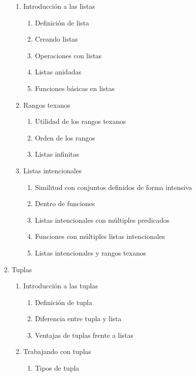 \documentclass[11pt, letter-paper]{article}
\begin{document}
\begin{enumerate}
\begin{enumerate}
        \item Introducción a las listas
        \begin{enumerate}
            \item Definición de lista
            \item Creando listas
            \item Operaciones con listas
            \item Listas anidadas
            \item Funciones básicas en listas
        \end{enumerate}
        \item Rangos texanos
        \begin{enumerate}
            \item Utilidad de los rangos texanos
            \item Orden de los rangos
            \item Listas infinitas
        \end{enumerate}
        \item Listas intencionales
        \begin{enumerate}
            \item Similitud con conjuntos definidos de forma intensiva
            \item Dentro de funciones
            \item Listas intencionales con múltiples predicados
            \item Funciones con múltiples listas intencionales
            \item Listas intencionales y rangos texanos
        \end{enumerate}
    \end{enumerate}
    \item Tuplas
    \begin{enumerate}
        \item Introducción a las tuplas
        \begin{enumerate}
            \item Definición de tupla
            \item Diferencia entre tupla y lista
            \item Ventajas de tuplas frente a listas
        \end{enumerate}
        \item Trabajando con tuplas
        \begin{enumerate}
            \item Tipos de tupla

\end{enumerate}
\end{enumerate}
\end{enumerate}
\end{document}
